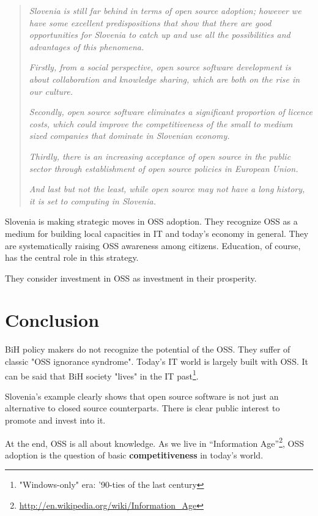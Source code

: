 \documentclass[times, utf8, seminar]{fit}
\begin{document}
\begin{quotation}
\emph{Slovenia is still far behind in terms of open source adoption; however we have some excellent predispositions that show that there are good opportunities for Slovenia to catch up and use all the possibilities and advantages of this phenomena.}

\emph{Firstly, from a social perspective, open source software development is about collaboration and knowledge sharing, which are both on the rise in our culture.} 

\emph{Secondly, open source software eliminates a significant proportion of licence costs, which could improve the competitiveness of the small to medium sized companies that dominate in Slovenian economy.} 

\emph{Thirdly, there is an increasing acceptance of open source in the public sector through establishment of open source policies in European Union.} 

\emph{And last but not the least, while open source may not have a long history, it is set to computing in Slovenia.}\citep{oss_slovenia}
\end{quotation}

Slovenia is making strategic moves in OSS adoption. They recognize OSS as a medium for building local capacities in IT and today's economy in general. They are systematically raising OSS awareness among citizens. Education, of course, has the central role in this strategy.

They consider investment in OSS as investment in their prosperity.
 
\chapter{Conclusion}

BiH policy makers do not recognize the potential of the OSS. They suffer of classic "OSS ignorance syndrome". Today's IT world is largely built with OSS. It can be said that BiH society "lives" in the IT past\footnote{"Windows-only" era: '90-ties of the last century}.  

Slovenia's example clearly shows that open source software is not just an alternative to closed source counterparts. There is clear public interest to promote and invest into it. 

At the end, OSS is all about knowledge. As we live in ``Information Age''\footnote{\url{http://en.wikipedia.org/wiki/Information\_Age}}, OSS adoption is the question of basic \textbf{competitiveness} in today's world. 
\end{document}
